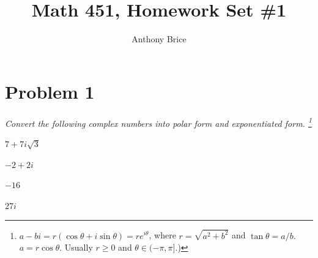 \documentclass{tufte-handout}
\title{Math 451, Homework Set \#1}
\author{Anthony Brice}
\begin{document}
\maketitle

\section{Problem 1}
\begin{description}
  \item \textit{Convert the following complex numbers into polar form
      and exponentiated form.
      \footnote{$a - bi = r(\cos\theta + i\sin\theta) = re^{i\theta}$,
      where $r = \sqrt{a^2 + b^2}$ and $\tan\theta = a/b.$\\
      $a = r\cos\theta$. Usually $r \geq 0$ and $\theta \in (-\pi,
      \pi]$.)}}
  \item[(a)] $7 + 7i\sqrt{3}$
  \item[(b)] $-2 + 2i$
  \item[(c)] $-16$
  \item[(d)] $27i$
\end{description}
\end{document}
